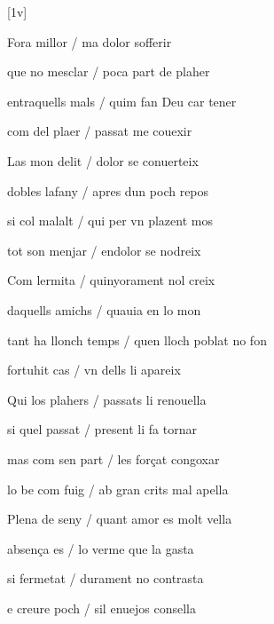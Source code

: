 [1v]
\begin{estrofa}

 Fora millor / ma dolor sofferir

 que no mesclar / poca part de plaher

 entraquells mals / quim fan Deu car tener

 com del plaer / passat me couexir

 Las mon delit / dolor se conuerteix

 dobles lafany / apres dun poch repos

 si col malalt / qui per vn plazent mos

 tot son menjar / endolor se nodreix

\end{estrofa}



\begin{estrofa}

 Com lermita / quinyorament nol creix

 daquells amichs / quauia en lo mon

 tant ha llonch temps / quen lloch poblat no fon

 fortuhit cas / vn dells li apareix

 Qui los plahers / passats li renouella

 si quel passat / present li fa tornar

 mas com sen part / les for\c{c}at congoxar

 lo be com fuig / ab gran crits mal apella

\end{estrofa}



\begin{tornada}

 Plena de seny / quant amor es molt vella

 absen\c{c}a es / lo verme que la gasta

 si fermetat / durament no contrasta

 e creure poch / sil enuejos consella

\end{tornada}





